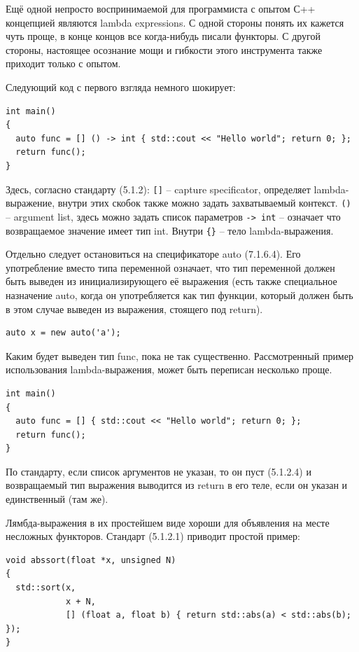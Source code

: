 \documentclass[a4paper,12pt,oneside]{article}
\begin{document}
Ещё одной непросто воспринимаемой для программиста с опытом С++ концепцией являются lambda expressions. С одной стороны понять их кажется чуть проще, в конце концов все когда-нибудь писали функторы. С другой стороны, настоящее осознание мощи и гибкости этого инструмента также приходит только с опытом. 

Следующий код с первого взгляда немного шокирует:

\begin{lstlisting}
int main()
{
  auto func = [] () -> int { std::cout << "Hello world"; return 0; };
  return func(); 
}
\end{lstlisting}

Здесь, согласно стандарту (5.1.2): 
\lstinline![]! -- capture specificator, определяет lambda-выражение, внутри этих скобок также можно задать захватываемый контекст.
\lstinline!()! -- argument list, здесь можно задать список параметров
\lstinline!-> int! -- означает что возвращаемое значение имеет тип int.
Внутри \lstinline!{}! -- тело lambda-выражения.

Отдельно следует остановиться на спецификаторе auto (7.1.6.4). Его употребление вместо типа переменной означает, что тип переменной должен быть выведен из инициализирующего её выражения (есть также специальное назначение auto, когда он употребляется как тип функции, который должен быть в этом случае выведен из выражения, стоящего под return).

\begin{lstlisting}
auto x = new auto('a');
\end{lstlisting}

Каким будет выведен тип func, пока не так существенно. Рассмотренный пример использования lambda-выражения, может быть переписан несколько проще.

\begin{lstlisting}
int main()
{
  auto func = [] { std::cout << "Hello world"; return 0; };
  return func(); 
}
\end{lstlisting}

По стандарту, если список аргументов не указан, то он пуст (5.1.2.4) и возвращаемый тип выражения выводится из return в его теле, если он указан и единственный (там же).

Лямбда-выражения в их простейшем виде хороши для объявления на месте несложных функторов. Стандарт (5.1.2.1) приводит простой пример:

\begin{lstlisting}
void abssort(float *x, unsigned N)
{
  std::sort(x, 
            x + N,
            [] (float a, float b) { return std::abs(a) < std::abs(b); });
}
\end{lstlisting}
\end{document}
